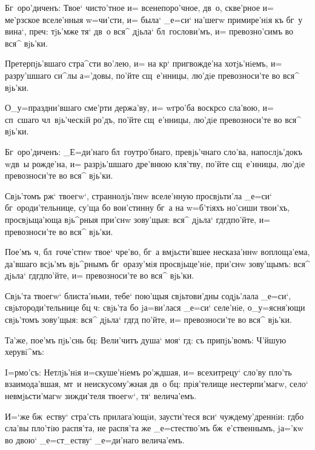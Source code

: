 Бг~оро'диченъ: Твое` чисто'тное и= всенепоро'чное, 
дв~о, скве'рное и= ме'рзское вселе'нныя w=чи'сти, и= 
была` _е=си` на'шегw примире'нiя къ бг~у вина`, 
преч: тjь'мже тя` дв~о вся^ дjьла` бл~гослови'мъ, и= 
превозно'симъ во вся^ вjь'ки.


Претерпjь'вшаго стра^сти во'лею, и= на кр` 
пригвожде'на хотjь'нiемъ, и= разру'шшаго си^лы а='довы, 
по'йте сщ~е'нницы, лю'дiе превозноси'те во вся^ вjь'ки.

О_у=праздни'вшаго сме'рти держа'ву, и= w\т гро'ба 
воскр со сла'вою, и= сп~сшаго чл~вjь'ческiй ро'дъ, 
по'йте сщ~е'нницы, лю'дiе превозноси'те во вся^ вjь'ки.

Бг~оро'диченъ: _Е=ди'наго бл~гоутро'бнаго, 
превjь'чнаго сло'ва, напослjь'докъ w\т дв~ы рожде'на, и= 
разрjь'шшаго дре'внюю кля'тву, по'йте сщ~е'нницы, лю'дiе 
превозноси'те во вся^ вjь'ки.


Свjь'томъ рж` твоегw`, страннолjь'пнw вселе'нную 
просвjьти'ла _е=си` бг~ороди'тельнице, су'ща бо 
вои'стинну бг~а на w=б'тiяхъ но'сиши твои'хъ, 
просвjьща'юща вjь^рныя при'снw зову'щыя: вся^ дjьла` 
гд гд по'йте, и= превозноси'те во вся^ вjь'ки.

Пое'мъ ч, бл~гоче'стнw твое` чре'во, бг~а 
вмjьсти'вшее несказа'ннw воплоща'ема, да'вшаго всjь'мъ 
вjь^рнымъ бг~оразу'мiя просвjьще'нiе, при'снw зову'щымъ: 
вся^ дjьла` гд гд по'йте, и= превозноси'те во вся^ 
вjь'ки.

Свjь'та твоегw` блиста'ньми, тебе` пою'щыя 
свjьтови'дны содjь'лала _е=си`, свjьтороди'тельнице бц 
ч: свjь'та бо jа=ви'лася _е=си` селе'нiе, 
о_у=ясня'ющи свjь'томъ зову'щыя: вся^ дjьла` гд гд 
по'йте, и= превозноси'те во вся^ вjь'ки.

Та'же, пое'мъ пjь'снь бц: Вели'читъ душа` моя` 
гд: съ припjь'вомъ: Ч'йшую херувi^мъ:


I=рмо'съ: Нетлjь'нiя и=скуше'нiемъ ро'ждшая, и= 
всехитрецу` сло'ву пло'ть взаимода'вшая, мт~и 
неискусому'жная дв~о бц: прiя'телище нестерпи'магw, 
село` невмjьсти'магw зижди'теля твоегw`, тя` велича'емъ.

И=`же бж~еству` стра'сть прилага'ющiи, заусти'теся 
вси` чуждему'дреннiи: гд бо сла'вы пло'тiю распя'та, 
не распя'та же _е=стество'мъ бж~е'ственнымъ, jа='кw во 
двою` _е=ст_еству` _е=ди'наго велича'емъ.

